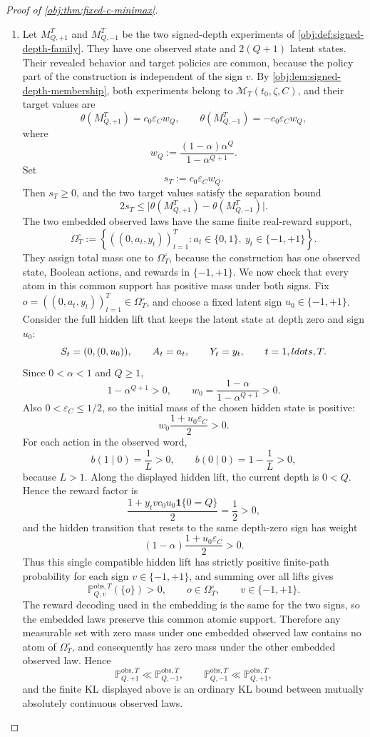 \documentclass[11pt]{article}
\begin{document}
\begin{proof}[Proof of \cref{obj:thm:fixed-c-minimax}]
\begin{enumerate}
\item Let \(M_{Q,+1}^T\) and \(M_{Q,-1}^T\) be the two signed-depth experiments of \cref{obj:def:signed-depth-family}. They have one observed state and \(2(Q+1)\) latent states. Their revealed behavior and target policies are common, because the policy part of the construction is independent of the sign \(v\). By \cref{obj:lem:signed-depth-membership}, both experiments belong to \(\mathcal M_T(t_0,\zeta,C)\), and their target values are
\[
\theta(M_{Q,+1}^T)=c_0\varepsilon_C w_Q,
\qquad
\theta(M_{Q,-1}^T)=-c_0\varepsilon_C w_Q,
\]
where
\[
w_Q
:=
\frac{(1-\alpha)\alpha^Q}{1-\alpha^{Q+1}} .
\]
Set
\[
s_T:=c_0\varepsilon_C w_Q .
\]
Then \(s_T\ge0\), and the two target values satisfy the separation bound
\[
2s_T
\le
\bigl|\theta(M_{Q,+1}^T)-\theta(M_{Q,-1}^T)\bigr|.
\]
The two embedded observed laws have the same finite real-reward support,
\[
\Omega_T^\circ
:=
\left\{
((0,a_t,y_t))_{t=1}^T:
 a_t\in\{0,1\},\ y_t\in\{-1,+1\}
\right\}.
\]
They assign total mass one to \(\Omega_T^\circ\), because the construction has one observed state, Boolean actions, and rewards in \(\{-1,+1\}\). We now check that every atom in this common support has positive mass under both signs. Fix
\(o=((0,a_t,y_t))_{t=1}^T\in\Omega_T^\circ\), and choose a fixed latent sign \(u_0\in\{-1,+1\}\). Consider the full hidden lift that keeps the latent state at depth zero and sign \(u_0\):
\[
S_t=(0,(0,u_0)),
\qquad
A_t=a_t,
\qquad
Y_t=y_t,
\qquad t=1,\\ldots,T.
\]
Since \(0<\alpha<1\) and \(Q\ge1\),
\[
1-\alpha^{Q+1}>0,
\qquad
w_0=\frac{1-\alpha}{1-\alpha^{Q+1}}>0.
\]
Also \(0<\varepsilon_C\le1/2\), so the initial mass of the chosen hidden state is positive:
\[
w_0\frac{1+u_0\varepsilon_C}{2}>0.
\]
For each action in the observed word,
\[
b(1\mid0)=\frac1L>0,
\qquad
b(0\mid0)=1-\frac1L>0,
\]
because \(L>1\). Along the displayed hidden lift, the current depth is \(0<Q\). Hence the reward factor is
\[
\frac{1+y_tvc_0u_0\mathbf 1\{0=Q\}}{2}=\frac12>0,
\]
and the hidden transition that resets to the same depth-zero sign has weight
\[
(1-\alpha)\frac{1+u_0\varepsilon_C}{2}>0.
\]
Thus this single compatible hidden lift has strictly positive finite-path probability for each sign \(v\in\{-1,+1\}\), and summing over all lifts gives
\[
\mathbb P_{Q,v}^{\mathrm{obs},T}(\{o\})>0,
\qquad o\in\Omega_T^\circ,
\qquad v\in\{-1,+1\}.
\]
The reward decoding used in the embedding is the same for the two signs, so the embedded laws preserve this common atomic support. Therefore any measurable set with zero mass under one embedded observed law contains no atom of \(\Omega_T^\circ\), and consequently has zero mass under the other embedded observed law. Hence
\[
\mathbb P_{Q,+1}^{\mathrm{obs},T}
\ll
\mathbb P_{Q,-1}^{\mathrm{obs},T},
\qquad
\mathbb P_{Q,-1}^{\mathrm{obs},T}
\ll
\mathbb P_{Q,+1}^{\mathrm{obs},T},
\]
and the finite KL displayed above is an ordinary KL bound between mutually absolutely continuous observed laws. %


\end{enumerate}
\end{proof}
\end{document}
